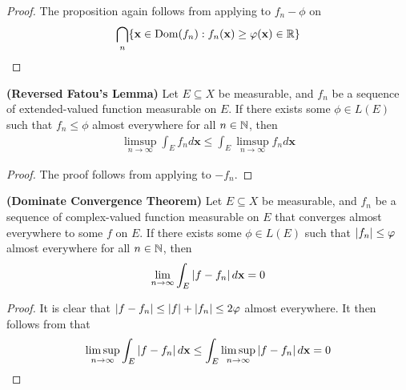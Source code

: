 \documentclass{report}
\begin{document}
\begin{proof}
The proposition again follows from applying  to $f_n - \phi$ on 
\begin{align*}
\bigcap_{n} \{ \textbf{x} \in \operatorname{Dom}(f_n): f_n(\textbf{x})\geq \varphi(\textbf{x})\in\mathbb{R} \}
\end{align*}
\end{proof}
\begin{theorem}
\label{RFL}
\textbf{(Reversed Fatou's Lemma)} 
 Let $E\subseteq X$ be measurable, and $f_n$ be a sequence of extended-valued function measurable on $E$. If there exists some $\phi \in L(E)$ such that $f_n\leq  \phi $ almost everywhere for all  $n\in\mathbb{N}$, then 
\begin{align*}
\limsup_{n\to\infty} \int_E f_nd\textbf{x}\leq \int_E \limsup_{n\to\infty} f_n d\textbf{x} 
\end{align*}
\end{theorem}
\begin{proof}
The proof follows from applying  to $-f_n$. 
\end{proof}
\begin{theorem}
\textbf{(Dominate Convergence Theorem)} Let $E\subseteq X$ be measurable, and $f_n$ be a sequence of complex-valued function measurable on  $E$ that converges almost everywhere to some $f$ on $E$. If  there exists some  $\phi \in L(E)$ such that $\left|f_n\right|\leq \varphi$ almost everywhere for all $n\in\mathbb{N}$, then
\begin{align*}
\lim_{n\to \infty}\int_E \left|f-f_n\right|d\textbf{x}=0
\end{align*}
\end{theorem}
\begin{proof}
It is clear that $\left|f-f_n\right|\leq \left|f\right|+\left|f_n\right|\leq 2\varphi$ almost everywhere. It then follows from  that 
\begin{align*}
\limsup_{n\to\infty} \int_E \left|f-f_n\right|d\textbf{x}\leq \int_E \limsup_{n\to\infty} \left|f-f_n\right|d\textbf{x}=0 
\end{align*}
\end{proof}
\end{document}
